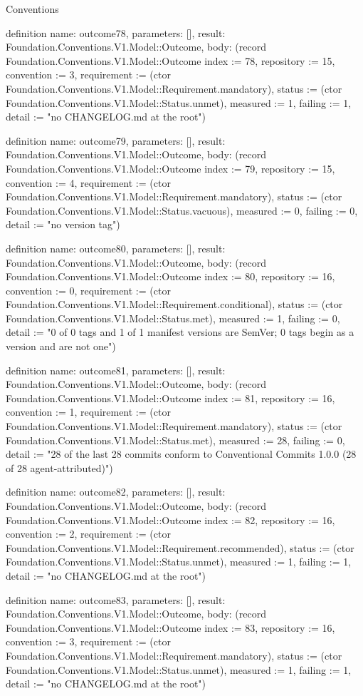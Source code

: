 \begin{lexlean}{Conventions}
\begin{semanticmodule}
definition{
  name: outcome78,
  parameters: [],
  result: Foundation.Conventions.V1.Model::Outcome,
  body: (record Foundation.Conventions.V1.Model::Outcome {index := 78, repository := 15, convention := 3, requirement := (ctor Foundation.Conventions.V1.Model::Requirement.mandatory), status := (ctor Foundation.Conventions.V1.Model::Status.unmet), measured := 1, failing := 1, detail := "no CHANGELOG.md at the root"})
}

definition{
  name: outcome79,
  parameters: [],
  result: Foundation.Conventions.V1.Model::Outcome,
  body: (record Foundation.Conventions.V1.Model::Outcome {index := 79, repository := 15, convention := 4, requirement := (ctor Foundation.Conventions.V1.Model::Requirement.mandatory), status := (ctor Foundation.Conventions.V1.Model::Status.vacuous), measured := 0, failing := 0, detail := "no version tag"})
}

definition{
  name: outcome80,
  parameters: [],
  result: Foundation.Conventions.V1.Model::Outcome,
  body: (record Foundation.Conventions.V1.Model::Outcome {index := 80, repository := 16, convention := 0, requirement := (ctor Foundation.Conventions.V1.Model::Requirement.conditional), status := (ctor Foundation.Conventions.V1.Model::Status.met), measured := 1, failing := 0, detail := "0 of 0 tags and 1 of 1 manifest versions are SemVer; 0 tags begin as a version and are not one"})
}

definition{
  name: outcome81,
  parameters: [],
  result: Foundation.Conventions.V1.Model::Outcome,
  body: (record Foundation.Conventions.V1.Model::Outcome {index := 81, repository := 16, convention := 1, requirement := (ctor Foundation.Conventions.V1.Model::Requirement.mandatory), status := (ctor Foundation.Conventions.V1.Model::Status.met), measured := 28, failing := 0, detail := "28 of the last 28 commits conform to Conventional Commits 1.0.0 (28 of 28 agent-attributed)"})
}

definition{
  name: outcome82,
  parameters: [],
  result: Foundation.Conventions.V1.Model::Outcome,
  body: (record Foundation.Conventions.V1.Model::Outcome {index := 82, repository := 16, convention := 2, requirement := (ctor Foundation.Conventions.V1.Model::Requirement.recommended), status := (ctor Foundation.Conventions.V1.Model::Status.unmet), measured := 1, failing := 1, detail := "no CHANGELOG.md at the root"})
}

definition{
  name: outcome83,
  parameters: [],
  result: Foundation.Conventions.V1.Model::Outcome,
  body: (record Foundation.Conventions.V1.Model::Outcome {index := 83, repository := 16, convention := 3, requirement := (ctor Foundation.Conventions.V1.Model::Requirement.mandatory), status := (ctor Foundation.Conventions.V1.Model::Status.unmet), measured := 1, failing := 1, detail := "no CHANGELOG.md at the root"})
}


\end{semanticmodule}
\end{lexlean}
